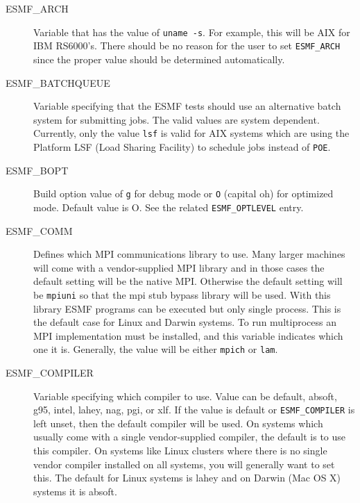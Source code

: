 \begin{description}

\item[ESMF\_ARCH] 

Variable that has the value of {\tt uname -s}.  For example, this will be
AIX for IBM RS6000's.  There should be no reason for the user to set 
{\tt ESMF\_ARCH} since the proper value should be determined automatically.

\item[ESMF\_BATCHQUEUE] 

Variable specifying that the ESMF tests should use an alternative batch
system for submitting jobs.  The valid values are system dependent.
Currently, only the value {\tt lsf} is valid for AIX systems which 
are using the Platform LSF (Load Sharing Facility) to schedule jobs
instead of {\tt POE}.

\item[ESMF\_BOPT] 

Build option value of {\tt g} for debug mode or {\tt O} (capital oh) for
optimized mode.  Default value is O.  See the related {\tt ESMF\_OPTLEVEL}
entry.

\item[ESMF\_COMM] 

Defines which MPI communications library to use.  Many larger machines
will come with a vendor-supplied  MPI library and in those cases the
default setting will be the native MPI.  Otherwise the default setting will
be {\tt mpiuni} so that the mpi stub bypass library will be used.  
With this library ESMF programs can be executed but only single process.
This is the default case for Linux and Darwin systems.  
To run multiprocess an MPI implementation must be installed, and this
variable indicates which one it is.  Generally, the value will be either
{\tt mpich} or {\tt lam}.

\item[ESMF\_COMPILER]

Variable specifying which compiler to use.  Value can be default,
absoft, g95, intel, lahey, nag, pgi, or xlf.  If the value is default 
or {\tt ESMF\_COMPILER} is left unset, then the default compiler will be
used. On systems which usually come with a single vendor-supplied
compiler, the default is to use this compiler.  On systems like
Linux clusters where there is no single vendor compiler installed
on all systems, you will generally want to set this.
The default for Linux systems is lahey and on Darwin (Mac OS X)
systems it is absoft.


\end{description}
